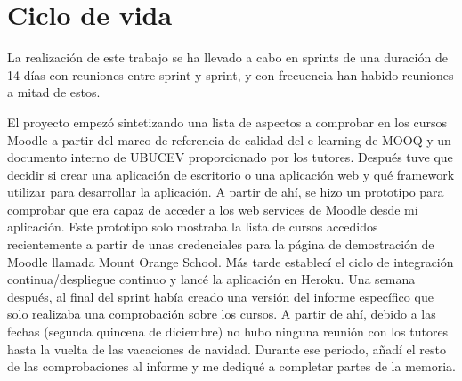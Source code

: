 \section{Ciclo de vida}
La realización de este trabajo se ha llevado a cabo en sprints de una duración de 14 días con reuniones entre sprint y sprint, y con frecuencia han habido reuniones a mitad de estos.

El proyecto empezó sintetizando una lista de aspectos a comprobar en los cursos Moodle a partir del marco de referencia de calidad del e-learning de MOOQ \cite{stracke2018quality} y un documento interno de UBUCEV proporcionado por los tutores.
Después tuve que decidir si crear una aplicación de escritorio o una aplicación web y qué framework utilizar para desarrollar la aplicación.
A partir de ahí, se hizo un prototipo para comprobar que era capaz de acceder a los web services de Moodle desde mi aplicación. Este prototipo solo mostraba la lista de cursos accedidos recientemente a partir de unas credenciales para la página de demostración de Moodle llamada Mount Orange School. Más tarde establecí el ciclo de integración continua/despliegue continuo y lancé la aplicación en Heroku. Una semana después, al final del sprint había creado una versión del informe específico que solo realizaba una comprobación sobre los cursos. A partir de ahí, debido a las fechas (segunda quincena de diciembre) no hubo ninguna reunión con los tutores hasta la vuelta de las vacaciones de navidad. Durante ese periodo, añadí el resto de las comprobaciones al informe y me dediqué a completar partes de la memoria.

